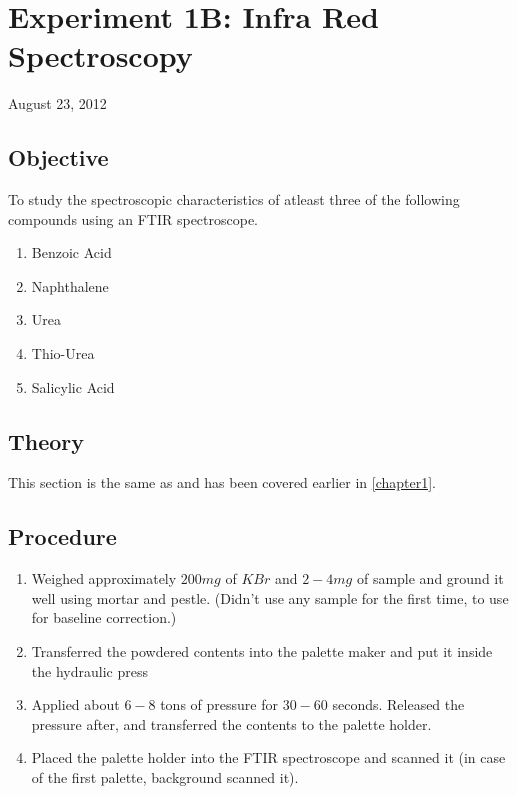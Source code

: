 \chapter{Experiment 1B: Infra Red Spectroscopy}
\begin{flushright}
August 23, 2012
\end{flushright}

\section{Objective}
	To study the spectroscopic characteristics of atleast three of the following compounds using an FTIR spectroscope.
	\begin{enumerate}
		\item Benzoic Acid
		\item Naphthalene
		\item Urea
		\item Thio-Urea
		\item Salicylic Acid
	\end{enumerate}

\section{Theory}
	This section is the same as and has been covered earlier in \autoref{chapter1}.\\

\section{Procedure}
	\begin{enumerate}
		\item Weighed approximately $200mg$ of $KBr$ and $2-4mg$ of sample and ground it well using mortar and pestle. (Didn't use any sample for the first time, to use for baseline correction.)
		\item Transferred the powdered contents into the palette maker and put it inside the hydraulic press
		\item Applied about $6-8$ tons of pressure for $30-60$ seconds. Released the pressure after, and transferred the contents to the palette holder.
		\item Placed the palette holder into the FTIR spectroscope and scanned it (in case of the first palette, background scanned it).
	\end{enumerate}

